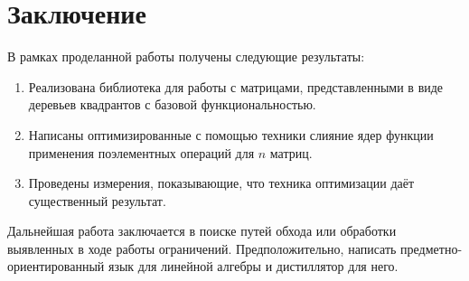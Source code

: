 
\section*{Заключение}
В рамках проделанной работы получены следующие результаты:
\begin{enumerate}
    \item Реализована библиотека для работы с матрицами, представленными в виде деревьев квадрантов с базовой функциональностью.
    \item Написаны оптимизированные с помощью техники слияние ядер функции применения поэлементных операций для $n$ матриц.
    \item Проведены измерения, показывающие, что техника оптимизации даёт существенный результат.
\end{enumerate}
Дальнейшая работа заключается в поиске путей обхода или обработки выявленных в ходе работы ограничений. Предположительно, написать предметно-ориентированный язык для линейной алгебры и дистиллятор для него.

